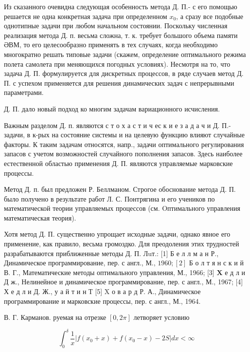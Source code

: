 \documentclass[10pt]{article}
\begin{document}
Из сказанного очевидна следующая особенность метода Д. П.- с его помощью решается не одна конкретная задача при определенном $x_{0}$, а сразу все подобные однотипные задачи при любом начальном состоянии. Поскольку численная реализация метода Д. п. весьма сложна, т. к. требует большого объема памяти ӘВМ, то его целесообразно применять в тех случаях, когда необходимо многократно решать типовые задачи (скажем, определение оптимального режима полета самолета при меняющихся погодных условиях). Несмотря на то, что задача Д. П. формулируется для дискретных процессов, в ряде случаев метод Д. П. с успехом применяется для решения динамических задач с непрерывными параметрами.



Д. П. дало новый подход ко многим задачам вариационного исчисления.



Важным разделом Д. п. являются с т о х а с т и ч ес к и е з а д а ч и Д. П.- задачи, в к-рых на состояние системы и на целевую функцию влияют случайные факторы. К таким задачам относятся, напр., задачи оптимального регулирования запасов с учетом возможностей случайного пополнения запасов. Здесь наиболее естественной областью применения Д. П. являются управляемые марковские процессы.



Метод Д. п. был предложен Р. Беллманом. Строгое обоснование метода Д. П. было получено в результате работ Л. С. Понтрягина и его учеников по математической теории управляемых процессов (см. Oптимального управления математическая теория).



Хотя метод Д. П. существенно упрощает исходные задачи, однако явное его применение, как правило, весьма громоздко. Для преодоления этих трудностей разрабатываются приближенные методы Д. П. Лuт.: [1] Б е л л м а н Р., Динамическое программирование, пер. с англ., М., $1960 ;[2]$ Б о л т я н с к и й В. Г., Математические методы оптимального управления, М., 1966; [3] $\mathbf{X}$ е д л и Д ж., Нелинейное и динамическое программирование, пер. с англ., М., 1967; [4] Х е д л и Д. Ж., у а й т и н Т [5] X о в а р д Р. А., Динамическое программирование и марковские процессы, пер. с англ., М., 1964.



В. Г. Карманов. руемая на отрезке $[0,2 \pi]$ летворяет условию



\[

\int_{0}^{\delta} \frac{1}{x}\left|f\left(x_{0}+x\right)+f\left(x_{0}-x\right)-2 S\right| d x<\infty

\]
\end{document}
